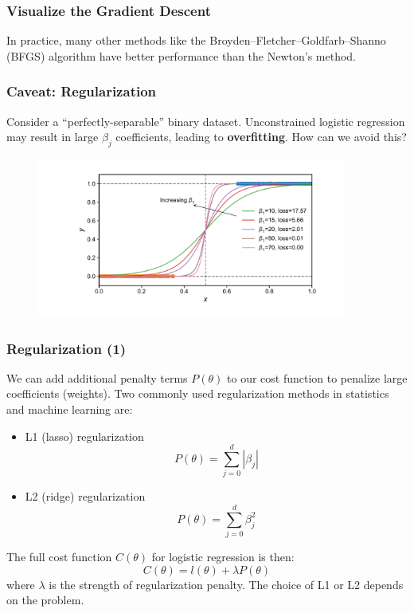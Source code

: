 \documentclass[10pt,aspectratio=169]{beamer}
\begin{document}
      \begin{frame}
        \frametitle{Visualize the Gradient Descent}

        In practice, many other methods like the
        Broyden–Fletcher–Goldfarb–Shanno (BFGS) algorithm have better
        performance than the Newton's method.
      \end{frame}

      \begin{frame}
        \frametitle{Caveat: Regularization}
        Consider a ``perfectly-separable'' binary
        dataset. Unconstrained logistic regression may result in large
        $\beta_{j}$ coefficients, leading to \textbf{overfitting}. How
        can we avoid this?

        \begin{figure}[t]
          \includegraphics[width=0.90\textwidth]{scripts/perfect_sep.pdf}
        \end{figure}
        
      \end{frame}

      \begin{frame}
        \frametitle{Regularization (1)}

        We can add additional penalty terms $P(\theta)$ to our cost
        function to penalize large coefficients (weights). Two
        commonly used regularization methods in statistics and machine
        learning are:

        \begin{itemize}
        \item L1 (lasso) regularization
          \begin{equation*}
            P(\theta) = \sum_{j=0}^{d} |\beta_{j}| 
          \end{equation*}

          
        \item L2 (ridge) regularization
          \begin{equation*}
            P(\theta) = \sum_{j=0}^{d} \beta_{j}^{2}
          \end{equation*}
        \end{itemize}

        The full cost function $C(\theta)$ for logistic regression is then:
        \begin{equation*}
          C(\theta) = l(\theta) + \lambda P(\theta)
        \end{equation*}
        where $\lambda$ is the strength of regularization penalty. The
        choice of L1 or L2 depends on the problem.
      \end{frame}
\end{document}
